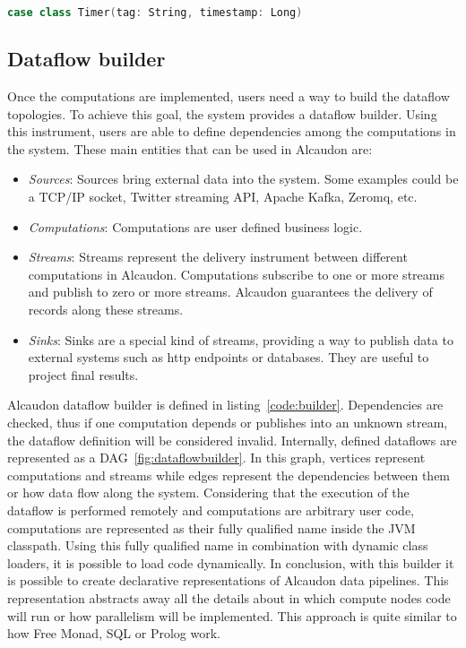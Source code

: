 \begin{lstlisting}[language=scala, frame=trBL, label=code:timers, float=ht, caption = {Timer class}]
  case class Timer(tag: String, timestamp: Long)
\end{lstlisting}

\subsection{Dataflow builder}

Once the computations are implemented, users need a way to build the dataflow topologies.
To achieve this goal, the system provides a dataflow builder. Using this instrument,
users are able to define dependencies among the computations in the system.
These main entities that can be used in Alcaudon are:

\begin{itemize}
  \item \textit{Sources}: Sources bring external data into the system. Some
    examples could be a TCP/IP socket, Twitter streaming API, Apache Kafka,
    Zeromq, etc.
  \item \textit{Computations}: Computations are user defined business logic.
  \item \textit{Streams}: Streams represent the delivery instrument between
    different computations in Alcaudon. Computations subscribe to one or more
    streams and publish to zero or more streams. Alcaudon guarantees the
    delivery of records along these streams.
  \item \textit{Sinks}: Sinks are a special kind of streams, providing a way to
    publish data to external systems such as http endpoints or databases. They
    are useful to project final results.
\end{itemize}

Alcaudon dataflow builder is defined in listing~\ref{code:builder}. Dependencies
are checked, thus if one computation depends or publishes into an unknown stream,
the dataflow definition will be considered invalid. Internally, defined
dataflows are represented as a \acf{DAG}~\ref{fig:dataflowbuilder}. In this graph, vertices
represent computations and streams while edges represent the dependencies
between them or how data flow along the system. Considering that the execution
of the dataflow is performed remotely and computations are arbitrary user code,
computations are represented as their fully qualified name inside the \acs{JVM}
classpath. Using this fully qualified name in combination with dynamic class
loaders, it is possible to load code dynamically. In conclusion, with this builder
it is possible to create declarative representations of Alcaudon data pipelines.
This representation abstracts away all the details about in which compute nodes
code will run or how parallelism will be implemented. This approach is quite
similar to how Free Monad\cite{freemonad}, SQL or Prolog work.

